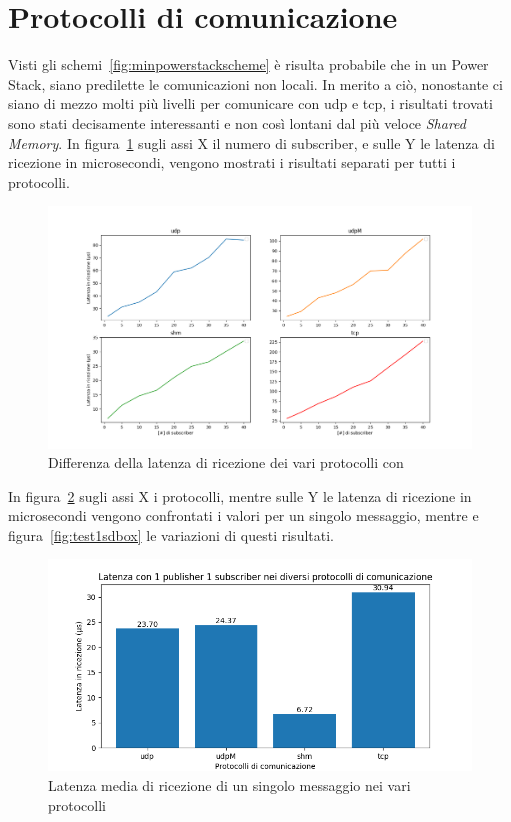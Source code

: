 \section{Protocolli di comunicazione}
Visti gli schemi~\ref{fig:minpowerstackscheme} è risulta probabile che in un Power Stack, siano predilette le comunicazioni non locali. In merito a ciò, nonostante ci siano di mezzo molti più livelli per comunicare con udp e tcp, i risultati trovati sono stati decisamente interessanti e non così lontani dal più veloce \emph{Shared Memory}. 
In figura~\ref{fig:test3_different_protocols} sugli assi X il numero di subscriber, e sulle Y le latenza di ricezione in microsecondi, vengono mostrati i risultati separati per tutti i protocolli.
\begin{figure}[H]
    \includegraphics[width=\textwidth]{./results/test3_different_protocol_send_receive.png} 
        \caption{Differenza della latenza di ricezione dei vari protocolli con }\label{fig:test3_different_protocols}
\end{figure}
In figura~\ref{fig:test3_different_protocols2} sugli assi X i protocolli, mentre sulle Y le latenza di ricezione in microsecondi vengono confrontati i valori per un singolo messaggio, mentre e figura~\ref{fig:test1sdbox} le variazioni di questi risultati.

\begin{figure}[H]
    \includegraphics[width=\textwidth]{./results/test1_bar_sr_1p1s.png} 
        \caption{Latenza media di ricezione di un singolo messaggio nei vari protocolli}\label{fig:test3_different_protocols2}
\end{figure}

